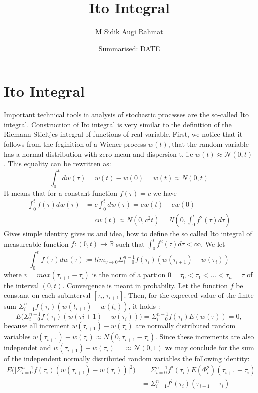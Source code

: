 \documentclass[a4paper]{article}
\title{Ito Integral}
\date{Summarised: DATE}
\author{M Sidik Augi Rahmat}
\begin{document}
\maketitle
\section{Ito Integral}
Important technical tools in analysis of stochastic processes are the so-called Ito integral. Construction of Ito integral is very similar to the definition of the Riemann-Stieltjes 
integral of functions of real variable. First, we notice that it follows from the feginition of a Wiener process $w(t)$, that the random variable has a normal distribution with
zero mean and dispersion t, i.e $w(t) \approx \mathcal{N}(0, t)$. This equality can be rewritten as:
\begin{equation}
    \int_0^t dw(\tau) = w(t) - w(0) = w(t) \approx N(0, t)
\end{equation}
It means that for a constant function $f(\tau) = c$ we have
\begin{align}
    \int_0^t f(\tau) dw(\tau) &= c \int_0^t dw(\tau) = cw(t) - cw(0)\\ \nonumber
                              &= cw(t) \approx N(0, c^2t) = N(0, \int_0^t f^2 (\tau) d\tau)
\end{align}
Gives simple identity gives us and idea, how to define the so called Ito integral of measureable function $f : (0, t) \rightarrow \mathbb{R}$ such that $ \int_0^t f^2(\tau)d\tau < \infty$.
We let 
\begin{equation}
    \int_0^t f(\tau) dw(\tau) := lim_{v\rightarrow 0} \Sigma_{i = 0}^{n-1}f(\tau_i)(w(\tau_{i+1}) - w(\tau_i))
\end{equation}
where $ v = max (\tau_{i+1} - \tau_i)$ is the norm of a partion $0 = \tau_0 < \tau_1 < ... < \tau_n = \tau$ of the interval $(0, t)$. Convergence is meant in probabilty.
Let the function $f$ be constant on each subinterval $[\tau_i, \tau_{i+1}]$. Then, for the expected value of the finite sum $\Sigma_{i= 1}^n f(\tau_i) (w(t_{i+1}) - 
w(t_i))$, it holds :
\begin{equation}
    E\bigg( \Sigma_{i=0}^{n-1} f(\tau_i)(w(\tau{i+1}) - w(\tau_i))\bigg) = \Sigma_{i=0}^{n-1}f(\tau_i)E(w(\tau)) = 0,
\end{equation}
because all increment $w(\tau_{i+1}) - w(\tau_i)$ are normally distributed random variables $w(\tau_{i+1}) - w(\tau_i) \approx N(0, \tau_{i+1} - \tau_{i})$. Since
these increments are also independet and $w(\tau_{i+1}) - w(\tau_i) = \approx \mathcal{N}(0, 1)$ we may conclude for the sum of the independent normally distributed random variables
the following identity:
\begin{align}
    E\bigg(\bigg[ \Sigma_{i=0}^{n-1} f(\tau_i) (w(\tau_{i+1}) - w(\tau_i))\bigg]^2 \bigg) &= \Sigma_{i=0}^{n-1} f^2(\tau_i) E(\Phi_i^{2})(\tau_{i+1}-\tau_i)\\
    &= \Sigma_{i=1}^{n}f^2(\tau_i)(\tau_{i+1}-\tau_{i})
\end{align}
\end{document}
